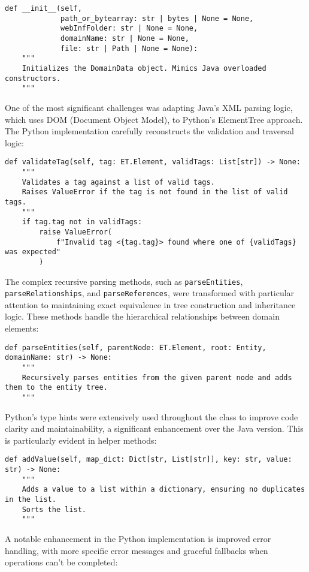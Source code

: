 \documentclass[12pt,a4paper]{article}
\begin{document}
\begin{verbatim}
def __init__(self,
             path_or_bytearray: str | bytes | None = None,
             webInfFolder: str | None = None,
             domainName: str | None = None,
             file: str | Path | None = None):
    """
    Initializes the DomainData object. Mimics Java overloaded constructors.
    """
\end{verbatim}

One of the most significant challenges was adapting Java's XML parsing logic, which uses DOM (Document Object Model), to Python's ElementTree approach. The Python implementation carefully reconstructs the validation and traversal logic:

\begin{verbatim}
def validateTag(self, tag: ET.Element, validTags: List[str]) -> None:
    """
    Validates a tag against a list of valid tags.
    Raises ValueError if the tag is not found in the list of valid tags.
    """
    if tag.tag not in validTags:
        raise ValueError(
            f"Invalid tag <{tag.tag}> found where one of {validTags} was expected"
        )
\end{verbatim}

The complex recursive parsing methods, such as \texttt{parseEntities}, \texttt{parseRelationships}, and \texttt{parseReferences}, were transformed with particular attention to maintaining exact equivalence in tree construction and inheritance logic. These methods handle the hierarchical relationships between domain elements:

\begin{verbatim}
def parseEntities(self, parentNode: ET.Element, root: Entity, domainName: str) -> None:
    """
    Recursively parses entities from the given parent node and adds them to the entity tree.
    """
\end{verbatim}

Python's type hints were extensively used throughout the class to improve code clarity and maintainability, a significant enhancement over the Java version. This is particularly evident in helper methods:

\begin{verbatim}
def addValue(self, map_dict: Dict[str, List[str]], key: str, value: str) -> None:
    """
    Adds a value to a list within a dictionary, ensuring no duplicates in the list.
    Sorts the list.
    """
\end{verbatim}

A notable enhancement in the Python implementation is improved error handling, with more specific error messages and graceful fallbacks when operations can't be completed:
\end{document}

